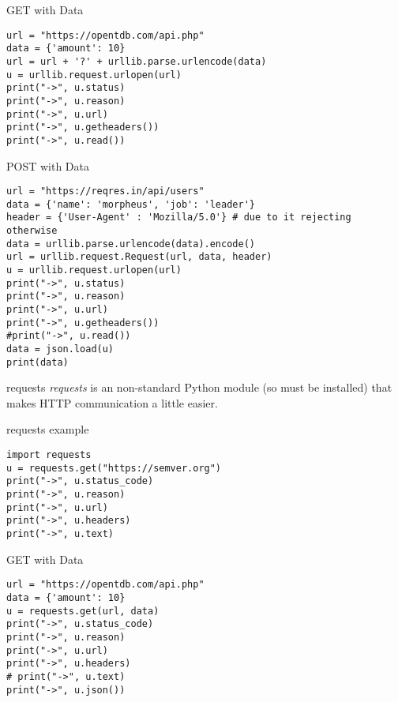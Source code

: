 \begin{frame}[containsverbatim]{GET with Data}
\begin{verbatim}
url = "https://opentdb.com/api.php"
data = {'amount': 10}
url = url + '?' + urllib.parse.urlencode(data)
u = urllib.request.urlopen(url)
print("->", u.status)
print("->", u.reason)
print("->", u.url)
print("->", u.getheaders())
print("->", u.read())
\end{verbatim}
\end{frame}

\begin{frame}[containsverbatim]{POST with Data}
\begin{verbatim}
url = "https://reqres.in/api/users"
data = {'name': 'morpheus', 'job': 'leader'}
header = {'User-Agent' : 'Mozilla/5.0'} # due to it rejecting otherwise
data = urllib.parse.urlencode(data).encode()
url = urllib.request.Request(url, data, header)
u = urllib.request.urlopen(url)
print("->", u.status)
print("->", u.reason)
print("->", u.url)
print("->", u.getheaders())
#print("->", u.read())
data = json.load(u)
print(data)
\end{verbatim}
\end{frame}

\begin{frame}{requests}
  \textit{requests} is an non-standard Python module (so must be installed) that makes HTTP communication a little easier.
\end{frame}

\begin{frame}[containsverbatim]{requests example}
\begin{verbatim}
import requests
u = requests.get("https://semver.org")
print("->", u.status_code)
print("->", u.reason)
print("->", u.url)
print("->", u.headers)
print("->", u.text)
\end{verbatim}
\end{frame}

\begin{frame}[containsverbatim]{GET with Data}
\begin{verbatim}
url = "https://opentdb.com/api.php"
data = {'amount': 10}
u = requests.get(url, data)
print("->", u.status_code)
print("->", u.reason)
print("->", u.url)
print("->", u.headers)
# print("->", u.text)
print("->", u.json())
\end{verbatim}
\end{frame}

